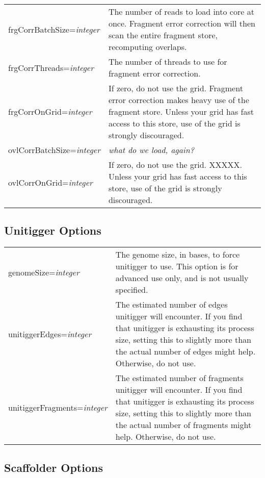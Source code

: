 \documentclass[twoside,11pt]{article}
\begin{document}
\begin{tabular}{lp{4.0in}}
frgCorrBatchSize={\it integer} &
The number of reads to load into core at once.  Fragment error correction will then
scan the entire fragment store, recomputing overlaps.
\\

frgCorrThreads={\it integer} &
The number of threads to use for fragment error correction.
\\

frgCorrOnGrid={\it integer} &
If zero, do not use the grid.  Fragment error correction makes heavy
use of the fragment store.  Unless your grid has fast
access to this store, use of the grid is strongly discouraged.
\\

ovlCorrBatchSize={\it integer} &
{\it what do we load, again?}
\\

ovlCorrOnGrid={\it integer} &
If zero, do not use the grid.  XXXXX.  Unless your grid has fast
access to this store, use of the grid is strongly discouraged.
\\
\end{tabular}




\subsection{Unitigger Options}

\begin{tabular}{lp{4.0in}}
genomeSize={\it integer} &
The genome size, in bases, to force unitigger to use.  This option is
for advanced use only, and is not usually specified.
\\

unitiggerEdges={\it integer} &
The estimated number of edges unitigger will encounter.  If you find that unitigger
is exhausting its process size, setting this to slightly more than the actual number of edges
might help.  Otherwise, do not use.
\\

unitiggerFragments={\it integer} &
The estimated number of fragments unitigger will encounter.  If you find that unitigger
is exhausting its process size, setting this to slightly more than the actual number of fragments
might help.  Otherwise, do not use.
\\
\end{tabular}



\subsection{Scaffolder Options}
\end{document}

